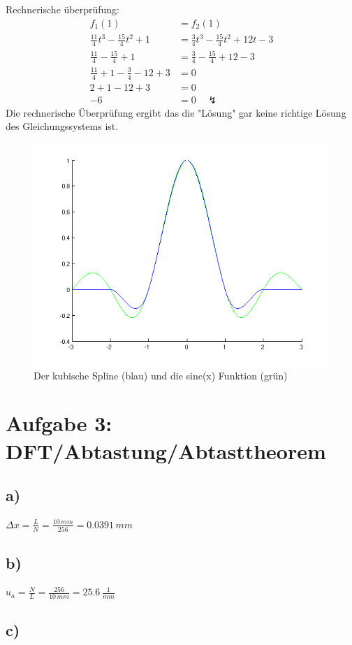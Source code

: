 \documentclass[a4paper,11pt,oneside]{scrartcl}
\begin{document}
Rechnerische überprüfung:
\begin{align*}
f_1(1) &= f_2(1)\\
\frac{11}{4}t^3 - \frac{15}{4}t^2 + 1 &= \frac{3}{4}t^3 - \frac{15}{4}t^2 + 12t - 3\\
\frac{11}{4} - \frac{15}{4} + 1 &= \frac{3}{4} - \frac{15}{4} + 12 - 3\\
\frac{11}{4} + 1 - \frac{3}{4}  - 12 + 3 &= 0\\
2+1-12+3&=0\\
-6&=0 \quad \lightning
\end{align*}
Die rechnerische Überprüfung ergibt das die "Lösung" gar keine richtige Lösung des Gleichungssystems ist.
\begin{figure}
\begin{center}
\includegraphics[width=.5\textwidth]{spline1}
\end{center}
\caption{Der kubische Spline (blau) und die sinc(x) Funktion (grün)}
\end{figure}
\newpage

\section*{Aufgabe 3: DFT/Abtastung/Abtasttheorem}
\subsection*{a)}

$\Delta x=\frac{L}{N}=\frac{10\,mm}{256}=0.0391\,mm$

\subsection*{b)}

$u_{a}=\frac{N}{L}=\frac{256}{10\,mm}=25.6\,\frac{1}{mm}$

\subsection*{c)}
\end{document}

